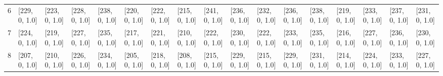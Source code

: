 \begin{tabular}{lllllllllllllllll}
6    &  [229, 0, 1.0] &    [223, 0, 1.0] &   [228, 0, 1.0] &    [238, 0, 1.0] &    [220, 0, 1.0] &  [222, 0, 1.0] &   [215, 0, 1.0] &    [241, 0, 1.0] &  [236, 0, 1.0] &   [232, 0, 1.0] &  [236, 0, 1.0] &  [238, 0, 1.0] &    [219, 0, 1.0] &    [233, 0, 1.0] &  [237, 0, 1.0] &  [231, 0, 1.0] \\
7    &  [224, 0, 1.0] &    [219, 0, 1.0] &   [227, 0, 1.0] &    [235, 0, 1.0] &    [217, 0, 1.0] &  [221, 0, 1.0] &   [210, 0, 1.0] &    [222, 0, 1.0] &  [230, 0, 1.0] &   [222, 0, 1.0] &  [233, 0, 1.0] &  [235, 0, 1.0] &    [216, 0, 1.0] &    [227, 0, 1.0] &  [236, 0, 1.0] &  [230, 0, 1.0] \\
8    &  [207, 0, 1.0] &    [210, 0, 1.0] &   [226, 0, 1.0] &    [234, 0, 1.0] &    [205, 0, 1.0] &  [218, 0, 1.0] &   [208, 0, 1.0] &    [215, 0, 1.0] &  [229, 0, 1.0] &   [215, 0, 1.0] &  [229, 0, 1.0] &  [231, 0, 1.0] &    [214, 0, 1.0] &    [224, 0, 1.0] &  [233, 0, 1.0] &  [227, 0, 1.0] \\
\bottomrule
\end{tabular}
